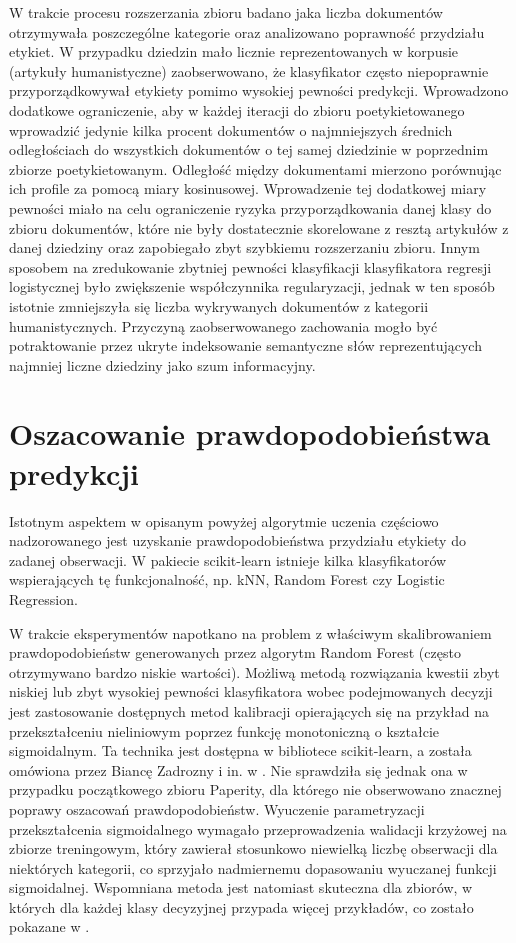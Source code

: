 \documentclass{pracamgr}
\begin{document}
W trakcie procesu rozszerzania zbioru badano jaka liczba dokumentów otrzymywała poszczególne kategorie oraz analizowano poprawność przydziału etykiet. W przypadku dziedzin mało licznie reprezentowanych w korpusie (artykuły humanistyczne) zaobserwowano, że klasyfikator często niepoprawnie przyporządkowywał etykiety pomimo wysokiej pewności predykcji. Wprowadzono dodatkowe ograniczenie, aby w każdej iteracji do zbioru poetykietowanego wprowadzić jedynie kilka procent dokumentów o najmniejszych średnich odległościach do wszystkich dokumentów o tej samej dziedzinie w poprzednim zbiorze poetykietowanym. Odległość między dokumentami mierzono porównując ich profile za pomocą miary kosinusowej. Wprowadzenie tej dodatkowej miary pewności miało na celu ograniczenie ryzyka przyporządkowania danej klasy do zbioru dokumentów, które nie były dostatecznie skorelowane z resztą artykułów z danej dziedziny oraz zapobiegało zbyt szybkiemu rozszerzaniu zbioru. Innym sposobem na zredukowanie zbytniej pewności klasyfikacji klasyfikatora regresji logistycznej było zwiększenie współczynnika regularyzacji, jednak w ten sposób istotnie zmniejszyła się liczba wykrywanych dokumentów z kategorii humanistycznych. Przyczyną zaobserwowanego zachowania mogło być potraktowanie przez ukryte indeksowanie semantyczne słów reprezentujących najmniej liczne dziedziny jako szum informacyjny.

\section{Oszacowanie prawdopodobieństwa predykcji}
Istotnym aspektem w opisanym powyżej algorytmie uczenia częściowo nadzorowanego jest uzyskanie prawdopodobieństwa przydziału etykiety do zadanej obserwacji. W pakiecie scikit-learn istnieje kilka klasyfikatorów wspierających tę funkcjonalność, np. kNN, Random Forest czy Logistic Regression. 

W trakcie eksperymentów napotkano na problem z właściwym skalibrowaniem prawdopodobieństw generowanych przez algorytm Random Forest (często otrzymywano bardzo niskie wartości). Możliwą metodą rozwiązania kwestii zbyt niskiej lub zbyt wysokiej pewności klasyfikatora wobec podejmowanych decyzji jest zastosowanie dostępnych metod kalibracji opierających się na przykład na przekształceniu nieliniowym poprzez funkcję monotoniczną o kształcie sigmoidalnym. Ta technika jest dostępna w bibliotece scikit-learn, a została omówiona przez Biancę Zadrozny i in. w \cite{zadrozny}. Nie sprawdziła się jednak ona w przypadku początkowego zbioru Paperity, dla którego nie obserwowano znacznej poprawy oszacowań prawdopodobieństw. Wyuczenie parametryzacji przekształcenia sigmoidalnego wymagało przeprowadzenia walidacji krzyżowej na zbiorze treningowym, który zawierał stosunkowo niewielką liczbę obserwacji dla niektórych kategorii, co sprzyjało nadmiernemu dopasowaniu wyuczanej funkcji sigmoidalnej. Wspomniana metoda jest natomiast skuteczna dla zbiorów, w których dla każdej klasy decyzyjnej przypada więcej przykładów, co zostało pokazane w \cite{zadrozny}. 
\end{document}
